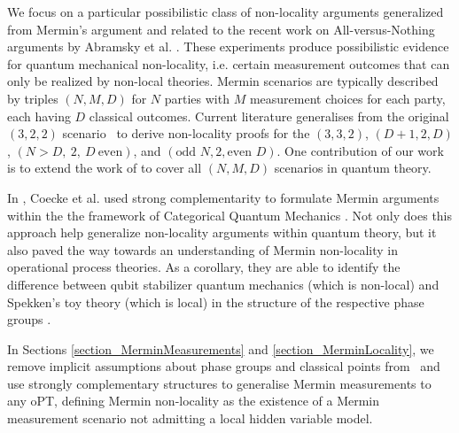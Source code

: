         We focus on a particular possibilistic class of non-locality arguments generalized from Mermin's argument \cite{mermin1990quantum} and related to the recent work on All-versus-Nothing arguments by Abramsky et al. \cite{NLC-AvN}. These experiments produce possibilistic evidence for quantum mechanical non-locality, i.e. certain measurement outcomes that can only be realized by non-local theories.  Mermin scenarios are typically described by triples $(N,M,D)$ for $N$ parties with $M$ measurement choices for each party, each having $D$ classical outcomes. Current literature generalises from the original $(3,2,2)$ scenario~\cite{mermin1990quantum} to derive non-locality proofs for the $(3,3,2)$\cite{ryu2014multisetting}, $(D+1,2,D)$\cite{zukowski-GHZ-multiport}, $(N>D,~2,~D~\mbox{even})$\cite{cerf-GHZ-many}, and $(\mbox{odd }N, 2, \mbox{even }D)$\cite{lee-even-dim}. One contribution of our work is to extend the work of \cite{coecke2012strong} to cover all $(N,M,D)$ scenarios in quantum theory.

In \cite{coecke2012strong}, Coecke et al. used strong complementarity to formulate Mermin arguments within the the framework of Categorical Quantum Mechanics \cite{abramsky2008categorical}. Not only does this approach help generalize non-locality arguments within quantum theory, but it also paved the way towards an understanding of Mermin non-locality in operational process theories. As a corollary, they are able to identify the difference between qubit stabilizer quantum mechanics (which is non-local) and Spekken's toy theory (which is local) in the structure of the respective phase groups \cite{coecke2012strong,coecke2011phase}.

In Sections \ref{section_MerminMeasurements} and \ref{section_MerminLocality}, we remove implicit assumptions about phase groups and classical points from~\cite{coecke2012strong} and use strongly complementary structures to generalise Mermin measurements to any oPT, defining Mermin non-locality as the existence of a Mermin measurement scenario not admitting a local hidden variable model.

